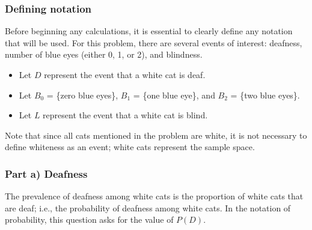 \subsubsection{Defining notation}

Before beginning any calculations, it is essential to clearly define any notation that will be used. For this problem, there are several events of interest: deafness, number of blue eyes (either 0, 1, or 2), and blindness. 

\begin{itemize}
	\item Let $D$ represent the event that a white cat is deaf.
	\item Let $B_0$ = \{zero blue eyes\}, $B_1$ = \{one blue eye\}, and $B_2$ = \{two blue eyes\}.
	\item Let $L$ represent the event that a white cat is blind.
\end{itemize}

Note that since all cats mentioned in the problem are white, it is not necessary to define whiteness as an event; white cats represent the sample space.

\subsubsection{Part a) Deafness}

The prevalence of deafness among white cats is the proportion of white cats that are deaf; i.e., the probability of deafness among white cats. In the notation of probability, this question asks for the value of $P(D)$.

